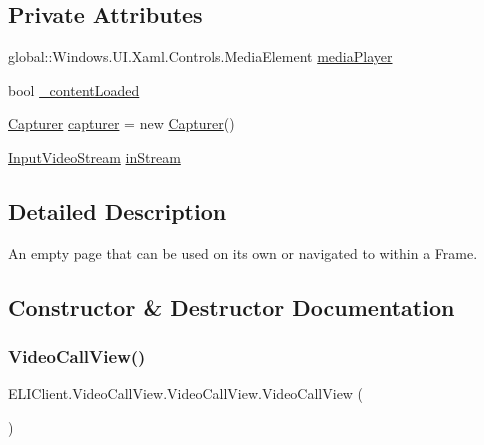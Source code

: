 \subsection*{Private Attributes}
\begin{DoxyCompactItemize}
\item 
global\+::\+Windows.\+U\+I.\+Xaml.\+Controls.\+Media\+Element \hyperlink{class_e_l_i_client_1_1_video_call_view_1_1_video_call_view_afd5d83e04237864b1b66556f674bcd31}{media\+Player}
\item 
bool \hyperlink{class_e_l_i_client_1_1_video_call_view_1_1_video_call_view_a2ab5998ed28bf4553bcd56486542cc04}{\+\_\+content\+Loaded}
\item 
\hyperlink{class_e_l_i_client_1_1_capturer}{Capturer} \hyperlink{class_e_l_i_client_1_1_video_call_view_1_1_video_call_view_a81d9faac1d2a2b04a3953b66735ea1f7}{capturer} = new \hyperlink{class_e_l_i_client_1_1_capturer}{Capturer}()
\item 
\hyperlink{class_e_l_i_client_1_1_input_video_stream}{Input\+Video\+Stream} \hyperlink{class_e_l_i_client_1_1_video_call_view_1_1_video_call_view_a4e598895140a3d124a297caa3f8c9c4f}{in\+Stream}
\end{DoxyCompactItemize}


\subsection{Detailed Description}
An empty page that can be used on its own or navigated to within a Frame. 



\subsection{Constructor \& Destructor Documentation}
\mbox{\label{class_e_l_i_client_1_1_video_call_view_1_1_video_call_view_a995d034384b778ad0563c7b95a7fe0f5}} 
\subsubsection{\texorpdfstring{Video\+Call\+View()}{VideoCallView()}}
{\footnotesize\ttfamily E\+L\+I\+Client.\+Video\+Call\+View.\+Video\+Call\+View.\+Video\+Call\+View (\begin{DoxyParamCaption}{ }\end{DoxyParamCaption})\hspace{0.3cm}{\ttfamily [inline]}}



